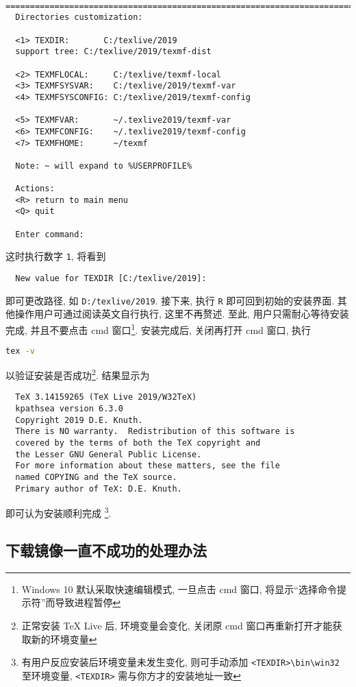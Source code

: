 \documentclass{ctexrep}
\begin{document}
\begin{lstlisting}
  ==============================================================================
  Directories customization:
  
  <1> TEXDIR:       C:/texlive/2019
  support tree: C:/texlive/2019/texmf-dist
  
  <2> TEXMFLOCAL:     C:/texlive/texmf-local
  <3> TEXMFSYSVAR:    C:/texlive/2019/texmf-var
  <4> TEXMFSYSCONFIG: C:/texlive/2019/texmf-config
  
  <5> TEXMFVAR:       ~/.texlive2019/texmf-var
  <6> TEXMFCONFIG:    ~/.texlive2019/texmf-config
  <7> TEXMFHOME:      ~/texmf
  
  Note: ~ will expand to %USERPROFILE%
  
  Actions:
  <R> return to main menu
  <Q> quit
  
  Enter command:
\end{lstlisting}
这时执行数字 \texttt{1}, 将看到
\begin{lstlisting}
  New value for TEXDIR [C:/texlive/2019]:
\end{lstlisting}
即可更改路径, 如 \texttt{D:/texlive/2019}. 
接下来, 执行 \texttt{R} 即可回到初始的安装界面. 
其他操作用户可通过阅读英文自行执行, 这里不再赘述. 
至此, 用户只需耐心等待安装完成, 并且不要点击 \textsf{cmd} 窗口\footnote{Windows 10 默认采取快速编辑模式, 一旦点击 \textsf{cmd} 窗口, 将显示``选择命令提示符''而导致进程暂停}. 
安装完成后, 关闭再打开 \textsf{cmd} 窗口, 执行
\begin{lstlisting}[language = bash]
  tex -v
\end{lstlisting}
以验证安装是否成功\footnote{正常安装 \TeX{} Live 后, 环境变量会变化, 关闭原 \textsf{cmd} 窗口再重新打开才能获取新的环境变量}. 
结果显示为
\begin{lstlisting}
  TeX 3.14159265 (TeX Live 2019/W32TeX)
  kpathsea version 6.3.0
  Copyright 2019 D.E. Knuth.
  There is NO warranty.  Redistribution of this software is
  covered by the terms of both the TeX copyright and
  the Lesser GNU General Public License.
  For more information about these matters, see the file
  named COPYING and the TeX source.
  Primary author of TeX: D.E. Knuth.
\end{lstlisting}
即可认为安装顺利完成 \footnote{有用户反应安装后环境变量未发生变化, 则可手动添加 \texttt{<TEXDIR>\textbackslash bin\textbackslash win32} 至环境变量, \texttt{<TEXDIR>} 需与你方才的安装地址一致}. 

\subsection{下载镜像一直不成功的处理办法}
\end{document}
